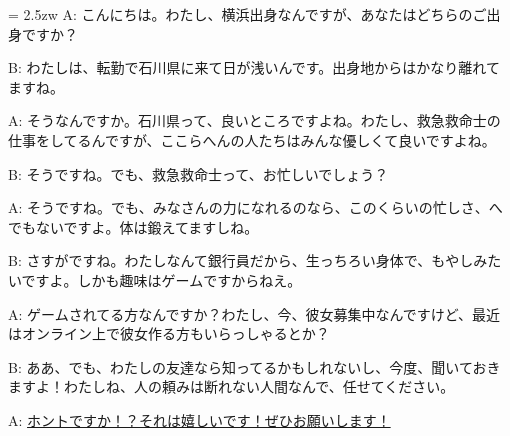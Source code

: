 \documentclass[11pt]{amsart}
\title{}
\author{}
\newenvironment{hangall}[1]{\hangindent = 2.5zw\everypar{\hangindent = 2.5zw}}{}
\begin{document}
\maketitle
\begin{hangall}{}%
A: こんにちは。わたし、横浜出身なんですが、あなたはどちらのご出身ですか？

B: わたしは、転勤で石川県に来て日が浅いんです。出身地からはかなり離れてますね。

A: そうなんですか。石川県って、良いところですよね。わたし、救急救命士の仕事をしてるんですが、ここらへんの人たちはみんな優しくて良いですよね。

B: そうですね。でも、救急救命士って、お忙しいでしょう？

A: そうですね。でも、みなさんの力になれるのなら、このくらいの忙しさ、へでもないですよ。体は鍛えてますしね。

B: さすがですね。わたしなんて銀行員だから、生っちろい身体で、もやしみたいですよ。しかも趣味はゲームですからねえ。

A: ゲームされてる方なんですか？わたし、今、彼女募集中なんですけど、最近はオンライン上で彼女作る方もいらっしゃるとか？

B: ああ、でも、わたしの友達なら知ってるかもしれないし、今度、聞いておきますよ！わたしね、人の頼みは断れない人間なんで、任せてください。

A: \ul{ホントですか！？それは嬉しいです！ぜひお願いします！}\end{hangall}
\end{document}
